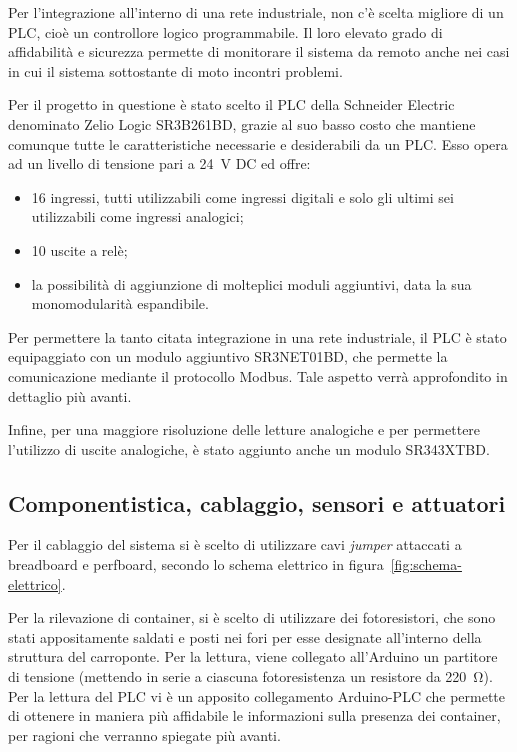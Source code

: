 Per l'integrazione all'interno di una rete industriale, non c'è scelta migliore di un PLC, cioè un
controllore logico programmabile. Il loro elevato grado di affidabilità e sicurezza permette di
monitorare il sistema da remoto anche nei casi in cui il sistema sottostante di moto incontri
problemi.

Per il progetto in questione è stato scelto il PLC della Schneider Electric denominato Zelio Logic
SR3B261BD, grazie al suo basso costo che mantiene comunque tutte le caratteristiche necessarie e
desiderabili da un PLC. Esso opera ad un livello di tensione pari a \qty{24}{\volt} DC ed offre:
\begin{itemize}
    \item 16 ingressi, tutti utilizzabili come ingressi digitali e solo gli ultimi sei utilizzabili
        come ingressi analogici;
    \item 10 uscite a relè;
    \item la possibilità di aggiunzione di molteplici moduli aggiuntivi, data la sua monomodularità espandibile.
\end{itemize}

Per permettere la tanto citata integrazione in una rete industriale, il PLC è stato equipaggiato con
un modulo aggiuntivo SR3NET01BD, che permette la comunicazione mediante il protocollo Modbus. Tale
aspetto verrà approfondito in dettaglio più avanti.

Infine, per una maggiore risoluzione delle letture analogiche e per permettere l'utilizzo di uscite
analogiche, è stato aggiunto anche un modulo SR343XTBD.

\subsection{Componentistica, cablaggio, sensori e attuatori}

Per il cablaggio del sistema si è scelto di utilizzare cavi \emph{jumper} attaccati a breadboard e
perfboard, secondo lo schema elettrico in figura~\ref{fig:schema-elettrico}.

Per la rilevazione di container, si è scelto di utilizzare dei fotoresistori, che sono stati
appositamente saldati e posti nei fori per esse designate all'interno della struttura del
carroponte. Per la lettura, viene collegato all'Arduino un partitore di tensione (mettendo in serie
a ciascuna fotoresistenza un resistore da \qty{220}{\ohm}). Per la lettura del PLC vi è un apposito
collegamento Arduino-PLC che permette di ottenere in maniera più affidabile le informazioni sulla
presenza dei container, per ragioni che verranno spiegate più avanti.

